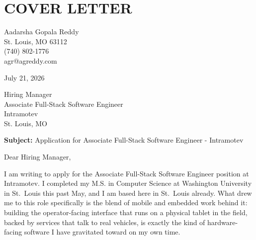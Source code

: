 \documentclass[10pt, letterpaper]{article}
\begin{document}
\vspace{\headerSpacing}
\section*{COVER LETTER}

\vspace{\headerSpacing}
\begin{onecolentry}
	Aadarsha Gopala Reddy\\
	St. Louis, MO 63112\\
	(740) 802-1776\\
	agr@agreddy.com\\
\end{onecolentry}

\vspace{\headerSpacing}
\begin{onecolentry}
	July 21, 2026\\
\end{onecolentry}

\vspace{\headerSpacing}
\begin{onecolentry}
	Hiring Manager\\
	Associate Full-Stack Software Engineer\\
	Intramotev\\
	St. Louis, MO\\
\end{onecolentry}

\vspace{\headerSpacing}
\begin{onecolentry}
	\textbf{Subject:} Application for Associate Full-Stack Software Engineer - Intramotev
\end{onecolentry}

\vspace{\headerSpacing}
\begin{onecolentry}
	Dear Hiring Manager,
\end{onecolentry}

\vspace{\headerSpacing}
\begin{onecolentry}
	I am writing to apply for the Associate Full-Stack Software Engineer position at Intramotev. I completed my M.S. in Computer Science at Washington University in St.~Louis this past May, and I am based here in St.~Louis already. What drew me to this role specifically is the blend of mobile and embedded work behind it: building the operator-facing interface that runs on a physical tablet in the field, backed by services that talk to real vehicles, is exactly the kind of hardware-facing software I have gravitated toward on my own time.
\end{onecolentry}
\end{document}
